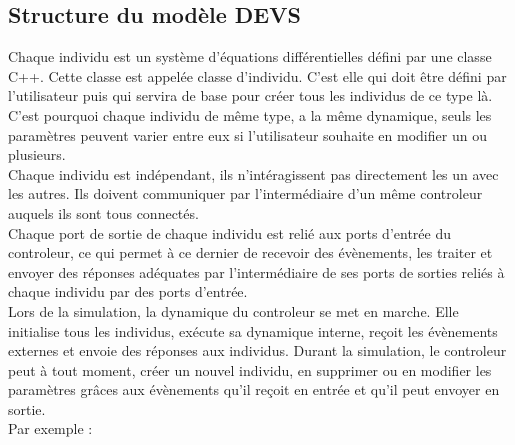 \subsection{Structure du modèle DEVS}
Chaque individu est un système d'équations différentielles défini par une classe C++. Cette classe est appelée classe d'individu. C'est elle qui doit être défini par l'utilisateur puis qui servira de base pour créer tous les individus de ce type là. C'est pourquoi chaque individu de même type, a la même dynamique, seuls les paramètres peuvent varier entre eux si l'utilisateur souhaite en modifier un ou plusieurs.\\
Chaque individu est indépendant, ils n'intéragissent pas directement les un avec les autres. Ils doivent communiquer par l'intermédiaire d'un même controleur auquels ils sont tous connectés.\\
Chaque port de sortie de chaque individu est relié aux ports d'entrée du controleur, ce qui permet à ce dernier de recevoir des évènements, les traiter et envoyer des réponses adéquates par l'intermédiaire de ses ports de sorties reliés à chaque individu par des ports d'entrée.\\
Lors de la simulation, la dynamique du controleur se met en marche. Elle initialise tous les individus, exécute sa dynamique interne, reçoit les évènements externes et envoie des réponses aux individus. Durant la simulation, le controleur peut à tout moment, créer un nouvel individu, en supprimer ou en modifier les paramètres grâces aux évènements qu'il reçoit en entrée et qu'il peut envoyer en sortie.\\
Par exemple :\\
\noindent\begin{minipage}{\linewidth}%
\end{minipage}


